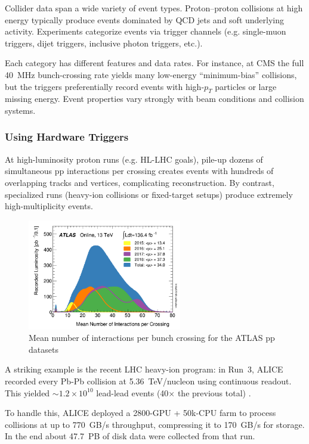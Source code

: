 \documentclass[letterpaper,12pt]{article}
\begin{document}
\begin{spacing}{1.125}
Collider data span a wide variety of event types. Proton–proton collisions at high energy typically produce events dominated by QCD jets and soft underlying activity. Experiments categorize events via trigger channels (e.g. single-muon triggers, dijet triggers, inclusive photon triggers, etc.).

Each category has different features and data rates. For instance, at CMS the full 40 MHz bunch-crossing rate yields many low-energy “minimum-bias” collisions, but the triggers preferentially record events with high-$p_T$ particles or large missing energy. Event properties vary strongly with beam conditions and collision systems.

\subsubsection{Using Hardware Triggers}

At high-luminosity proton runs (e.g. HL-LHC goals), pile-up dozens of simultaneous $\mathrm{pp}$ interactions per crossing creates events with hundreds of overlapping tracks and vertices, complicating reconstruction. By contrast, specialized runs (heavy-ion collisions or fixed-target setups) produce extremely high-multiplicity events.

\begin{figure}[H]
  \center
  \includegraphics[width=0.6\textwidth]{hl}
  \caption{Mean number of interactions per bunch crossing for the ATLAS pp datasets }
\end{figure}

A striking example is the recent LHC heavy-ion program: in Run 3, ALICE recorded every Pb-Pb collision at 5.36 TeV/nucleon using continuous readout. This yielded $\sim1.2\times10^{10}$ lead-lead events (40× the previous total)
.

To handle this, ALICE deployed a 2800-GPU + 50k-CPU farm to process collisions at up to 770 GB/s throughput, compressing it to 170 GB/s for storage. In the end about 47.7 PB of disk data were collected from that run.


\end{spacing}
\end{document}
